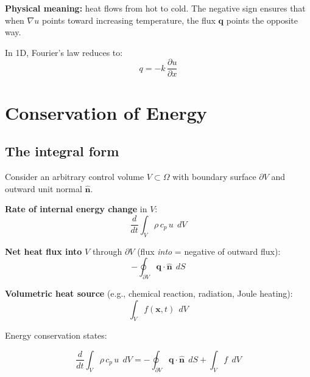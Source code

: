 \documentclass[11pt]{article}
\newcommand{\pd}[2]{\frac{\partial #1}{\partial #2}}
\begin{document}
\medskip
\noindent
\textbf{Physical meaning:} heat flows from hot to cold. The negative sign ensures that when
$\nabla u$ points toward increasing temperature, the flux $\mathbf{q}$ points the opposite way.

\medskip
\noindent
In 1D, Fourier's law reduces to:
\begin{equation}
  q = -k\,\pd{u}{x}
  \label{eq:fourier_1d}
\end{equation}

\section{Conservation of Energy}

\subsection{The integral form}

Consider an arbitrary control volume $V \subset \Omega$ with boundary surface $\partial V$ and outward unit normal $\hat{\mathbf{n}}$.

\medskip
\noindent
\textbf{Rate of internal energy change} in $V$:
\begin{equation}
  \frac{d}{dt}\int_V \rho\, c_p\, u \;\, dV
\end{equation}

\noindent
\textbf{Net heat flux into} $V$ through $\partial V$ (flux \emph{into} = negative of outward flux):
\begin{equation}
  -\oint_{\partial V} \mathbf{q} \cdot \hat{\mathbf{n}} \;\, dS
\end{equation}

\noindent
\textbf{Volumetric heat source} (e.g., chemical reaction, radiation, Joule heating):
\begin{equation}
  \int_V f(\mathbf{x}, t) \;\, dV
\end{equation}

\medskip
\noindent
Energy conservation states:
\begin{tcolorbox}[colback=green!5, colframe=green!50!black, title=Integral Energy Balance]
\begin{equation}
  \frac{d}{dt}\int_V \rho\, c_p\, u \;\, dV
  = -\oint_{\partial V} \mathbf{q} \cdot \hat{\mathbf{n}} \;\, dS
  + \int_V f \;\, dV
  \label{eq:energy_integral}
\end{equation}
\end{tcolorbox}
\end{document}
